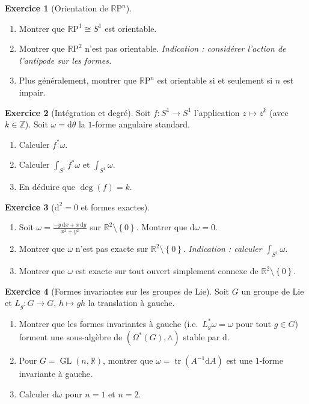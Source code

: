 \documentclass[12pt,a4paper,openany]{book}
\theoremstyle{definition}
\newtheorem{exercice}{Exercice}[chapter]
\theoremstyle{plain}
\theoremstyle{remark}
\newcommand{\Z}{\mathbb{Z}}
\newcommand{\R}{\mathbb{R}}
\newcommand{\RP}{\mathbb{R}\mathrm{P}}
\DeclareMathOperator{\GL}{GL}
\newcommand{\dd}{\mathrm{d}}
\newcommand{\set}[1]{\left\{#1\right\}}
\begin{document}
\begin{exercice}[Orientation de $\RP^n$]\label{exo:orientation-RPn}
\begin{enumerate}[label=\textup{(\alph*)}]
  \item Montrer que $\RP^1 \cong S^1$ est orientable.
  \item Montrer que $\RP^2$ n'est pas orientable.
    \textit{Indication : considérer l'action de l'antipode sur les
    formes.}
  \item Plus généralement, montrer que $\RP^n$ est orientable si et
    seulement si $n$ est impair.
\end{enumerate}
\end{exercice}

\begin{exercice}[Intégration et degré]\label{exo:integration-degre}
Soit $f \colon S^1 \to S^1$ l'application $z \mapsto z^k$ (avec $k \in \Z$).
Soit $\omega = \dd\theta$ la $1$-forme angulaire standard.
\begin{enumerate}[label=\textup{(\alph*)}]
  \item Calculer $f^*\omega$.
  \item Calculer $\int_{S^1} f^*\omega$ et $\int_{S^1} \omega$.
  \item En déduire que $\deg(f) = k$.
\end{enumerate}
\end{exercice}

\begin{exercice}[$\dd^2 = 0$ et formes exactes]\label{exo:d2-exactes}
\begin{enumerate}[label=\textup{(\alph*)}]
  \item Soit $\omega = \frac{-y\,\dd x + x\,\dd y}{x^2 + y^2}$ sur
    $\R^2 \setminus \set{0}$. Montrer que $\dd\omega = 0$.
  \item Montrer que $\omega$ n'est pas exacte sur
    $\R^2 \setminus \set{0}$.
    \textit{Indication : calculer $\int_{S^1} \omega$.}
  \item Montrer que $\omega$ est exacte sur tout ouvert simplement
    connexe de $\R^2 \setminus \set{0}$.
\end{enumerate}
\end{exercice}

\begin{exercice}[Formes invariantes sur les groupes de Lie]%
\label{exo:formes-invariantes}
Soit $G$ un groupe de Lie et $L_g \colon G \to G$, $h \mapsto gh$ la
translation à gauche.
\begin{enumerate}[label=\textup{(\alph*)}]
  \item Montrer que les formes invariantes à gauche (i.e.\
    $L_g^*\omega = \omega$ pour tout $g \in G$) forment une sous-algèbre
    de $(\Omega^*(G), \wedge)$ stable par $\dd$.
  \item Pour $G = \GL(n, \R)$, montrer que
    $\omega = \operatorname{tr}(A^{-1} \dd A)$ est une $1$-forme
    invariante à gauche.
  \item Calculer $\dd\omega$ pour $n = 1$ et $n = 2$.
\end{enumerate}
\end{exercice}
\end{document}
